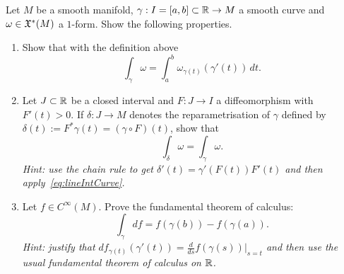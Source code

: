 \begin{exercise}\label{exe:FTC}
	Let $M$ be a smooth manifold, $\gamma: I = [a,b]\subset \mathbb{R} \to M$ a smooth curve and $\omega\in\mathfrak{X}^*(M)$ a $1$-form.
	Show the following properties.
	\begin{enumerate}
		\item Show that with the definition above
		      \begin{equation}\label{eq:lineIntCurve}
			      \int_\gamma \omega = \int_a^b \omega_{\gamma(t)}(\gamma'(t))\, dt.
		      \end{equation}
		\item Let $J\subset\mathbb{R}$ be a closed interval  and $F: J\to I$ a diffeomorphism with $F'(t) > 0$.
		      If $\delta : J \to M$ denotes the reparametrisation of $\gamma$ defined by $\delta(t) := F^*\gamma(t) = (\gamma\circ F)(t)$, show that
		      \begin{equation}
			      \int_\delta \omega = \int_\gamma \omega.
		      \end{equation}
		      \textit{\small Hint: use the chain rule to get $\delta'(t) = \gamma'(F(t))F'(t)$ and then apply~\eqref{eq:lineIntCurve}.}
		\item Let $f\in C^\infty(M)$. Prove the fundamental theorem of calculus:
		      \begin{equation}
			      \int_\gamma df = f(\gamma(b)) - f(\gamma(a)).
		      \end{equation}
		      \textit{\small Hint: justify that $df_{\gamma(t)}(\gamma'(t)) = \frac{d}{ds}f(\gamma(s))\big|_{s=t}$ and then use the usual fundamental theorem of calculus on $\mathbb{R}$.}
	\end{enumerate}
\end{exercise}

